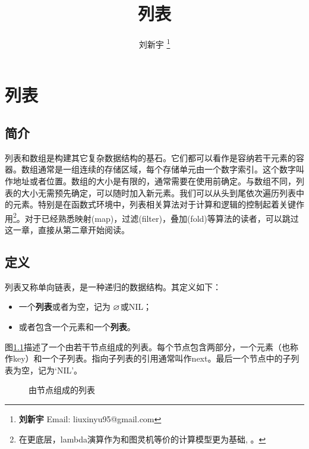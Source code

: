 \documentclass[b5paper]{ctexart}
\begin{document}
\title{列表}

\author{刘新宇
\thanks{{\bfseries 刘新宇} \newline
  Email: liuxinyu95@gmail.com \newline}
  }

\maketitle
\fi


\ifx\wholebook\relax
\chapter{列表}
\fi

\section{简介}
\label{introduction}

列表和数组是构建其它复杂数据结构的基石。它们都可以看作是容纳若干元素的容器。数组通常是一组连续的存储区域，每个存储单元由一个数字索引。这个数字叫作地址或者位置。数组的大小是有限的，通常需要在使用前确定。与数组不同，列表的大小无需预先确定，可以随时加入新元素。我们可以从头到尾依次遍历列表中的元素。特别是在函数式环境中，列表相关算法对于计算和逻辑的控制起着关键作用\footnote{在更底层，lambda演算作为和图灵机等价的计算模型更为基础\cite{mittype}, \cite{unplugged}。}。对于已经熟悉映射(map)，过滤(filter)，叠加(fold)等算法的读者，可以跳过这一章，直接从第二章开始阅读。

\section{定义}

列表又称单向链表，是一种递归的数据结构。其定义如下：

\begin{itemize}
\item 一个\textbf{列表}或者为空，记为 $\varnothing$或NIL；
\item 或者包含一个元素和一个\textbf{列表}。
\end{itemize}

图\ref{fig:list-example}描述了一个由若干节点组成的列表。每个节点包含两部分，一个元素（也称作key）和一个子列表。指向子列表的引用通常叫作next。最后一个节点中的子列表为空，记为‘NIL’。

\begin{figure}[htbp]
  \centering
  \caption{由节点组成的列表}
  \label{fig:list-example}
\end{figure}
\end{document}
